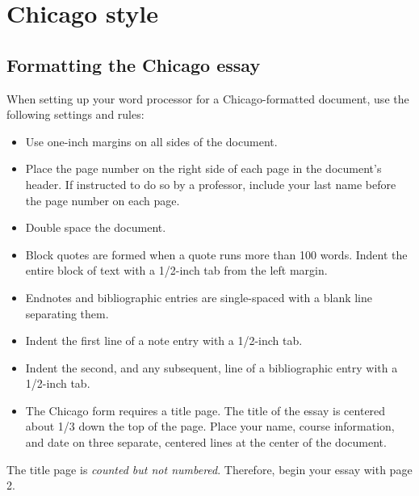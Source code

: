 
\chapter{Chicago style}

\section{Formatting the Chicago essay}

When setting up your word processor for a Chicago-formatted document, use the
following settings and rules:

\begin{itemize} 

\item Use one-inch margins on all sides of the document. 

\item Place the page number on the right side of each page in the
document's header. If instructed to do so by a professor, include your last name before the page number on each page. 

\item Double space the document. 

\item Block quotes are formed when a quote runs more than 100 words. Indent the entire  block of text
with a 1/2-inch tab from the left margin. 
\item Endnotes and bibliographic entries are single-spaced with a blank line separating them. 
\item Indent the first line of a note entry with a 1/2-inch tab. 
\item Indent the second, and any subsequent, line of a bibliographic entry with a 1/2-inch tab. 
\item The Chicago form requires a title page. The title of the essay is centered about  1/3 down
the top of the page. Place your name, course information, and date on three
separate, centered lines at the center of the document.
\end{itemize}
\bigskip

\begin{center}
\begin{tcolorbox}[colframe=oyster, coltitle=black, sharp corners, title=\ding{52} Note!]
The title page is \emph{counted but not
numbered}. Therefore,  begin your essay with page 2.
\end{tcolorbox}
\end{center}

